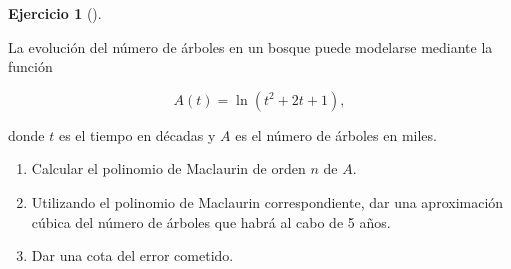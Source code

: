 \documentclass[
  spanish,
  a4paper,
]{scrreport}
\providecommand{\tightlist}{%
  \setlength{\itemsep}{0pt}\setlength{\parskip}{0pt}}
\theoremstyle{definition}
\newtheorem{exercise}{Ejercicio}[chapter]
\theoremstyle{remark}
\begin{document}
\begin{exercise}[]\protect\hypertarget{exr-6}{}\label{exr-6}

La evolución del número de árboles en un bosque puede modelarse mediante
la función

\[
A(t) = \ln(t^2  + 2t + 1),
\]

donde \(t\) es el tiempo en décadas y \(A\) es el número de árboles en
miles.

\begin{enumerate}
\def\labelenumi{\alph{enumi}.}
\tightlist
\item
  Calcular el polinomio de Maclaurin de orden \(n\) de \(A\).
\item
  Utilizando el polinomio de Maclaurin correspondiente, dar una
  aproximación cúbica del número de árboles que habrá al cabo de 5 años.
\item
  Dar una cota del error cometido.
\end{enumerate}

\end{exercise}
\end{document}
